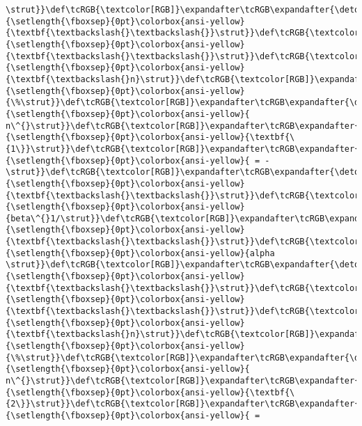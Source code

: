 \documentclass[landscape,letterpaper,10pt,english]{article}
\begin{document}
\begin{Verbatim}[commandchars=\\\{\}, frame=single, framerule=2mm, rulecolor=\color{outerrorbackground}]
\strut}}\def\tcRGB{\textcolor[RGB]}\expandafter\tcRGB\expandafter{\detokenize{175,95,0}}{\setlength{\fboxsep}{0pt}\colorbox{ansi-yellow}{\textbf{\textbackslash{}\textbackslash{}}\strut}}\def\tcRGB{\textcolor[RGB]}\expandafter\tcRGB\expandafter{\detokenize{175,95,0}}{\setlength{\fboxsep}{0pt}\colorbox{ansi-yellow}{\textbf{\textbackslash{}\textbackslash{}}\strut}}\def\tcRGB{\textcolor[RGB]}\expandafter\tcRGB\expandafter{\detokenize{175,95,0}}{\setlength{\fboxsep}{0pt}\colorbox{ansi-yellow}{\textbf{\textbackslash{}n}\strut}}\def\tcRGB{\textcolor[RGB]}\expandafter\tcRGB\expandafter{\detokenize{175,0,0}}{\setlength{\fboxsep}{0pt}\colorbox{ansi-yellow}{\%\strut}}\def\tcRGB{\textcolor[RGB]}\expandafter\tcRGB\expandafter{\detokenize{175,0,0}}{\setlength{\fboxsep}{0pt}\colorbox{ansi-yellow}{  n\^{}\strut}}\def\tcRGB{\textcolor[RGB]}\expandafter\tcRGB\expandafter{\detokenize{175,95,135}}{\setlength{\fboxsep}{0pt}\colorbox{ansi-yellow}{\textbf{\{1\}}\strut}}\def\tcRGB{\textcolor[RGB]}\expandafter\tcRGB\expandafter{\detokenize{175,0,0}}{\setlength{\fboxsep}{0pt}\colorbox{ansi-yellow}{ = -\strut}}\def\tcRGB{\textcolor[RGB]}\expandafter\tcRGB\expandafter{\detokenize{175,95,0}}{\setlength{\fboxsep}{0pt}\colorbox{ansi-yellow}{\textbf{\textbackslash{}\textbackslash{}}\strut}}\def\tcRGB{\textcolor[RGB]}\expandafter\tcRGB\expandafter{\detokenize{175,0,0}}{\setlength{\fboxsep}{0pt}\colorbox{ansi-yellow}{beta\^{}1/\strut}}\def\tcRGB{\textcolor[RGB]}\expandafter\tcRGB\expandafter{\detokenize{175,95,0}}{\setlength{\fboxsep}{0pt}\colorbox{ansi-yellow}{\textbf{\textbackslash{}\textbackslash{}}\strut}}\def\tcRGB{\textcolor[RGB]}\expandafter\tcRGB\expandafter{\detokenize{175,0,0}}{\setlength{\fboxsep}{0pt}\colorbox{ansi-yellow}{alpha \strut}}\def\tcRGB{\textcolor[RGB]}\expandafter\tcRGB\expandafter{\detokenize{175,95,0}}{\setlength{\fboxsep}{0pt}\colorbox{ansi-yellow}{\textbf{\textbackslash{}\textbackslash{}}\strut}}\def\tcRGB{\textcolor[RGB]}\expandafter\tcRGB\expandafter{\detokenize{175,95,0}}{\setlength{\fboxsep}{0pt}\colorbox{ansi-yellow}{\textbf{\textbackslash{}\textbackslash{}}\strut}}\def\tcRGB{\textcolor[RGB]}\expandafter\tcRGB\expandafter{\detokenize{175,95,0}}{\setlength{\fboxsep}{0pt}\colorbox{ansi-yellow}{\textbf{\textbackslash{}n}\strut}}\def\tcRGB{\textcolor[RGB]}\expandafter\tcRGB\expandafter{\detokenize{175,0,0}}{\setlength{\fboxsep}{0pt}\colorbox{ansi-yellow}{\%\strut}}\def\tcRGB{\textcolor[RGB]}\expandafter\tcRGB\expandafter{\detokenize{175,0,0}}{\setlength{\fboxsep}{0pt}\colorbox{ansi-yellow}{  n\^{}\strut}}\def\tcRGB{\textcolor[RGB]}\expandafter\tcRGB\expandafter{\detokenize{175,95,135}}{\setlength{\fboxsep}{0pt}\colorbox{ansi-yellow}{\textbf{\{2\}}\strut}}\def\tcRGB{\textcolor[RGB]}\expandafter\tcRGB\expandafter{\detokenize{175,0,0}}{\setlength{\fboxsep}{0pt}\colorbox{ansi-yellow}{ = 
\end{Verbatim}
\end{document}
